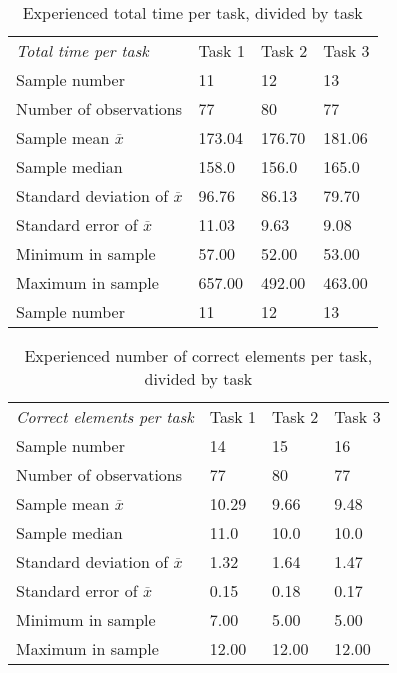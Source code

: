 \begin{table}[H]
	\centering
	\begin{tabular}{l|l|l|l}
		\textit{Total time per task} & Task 1 & Task 2 & Task 3 \\ 
		Sample number & 11  & 12  & 13   \\ \hline
		Number of observations & 77  & 80   & 77  \\
		Sample mean $\overline{x}$  & 173.04  &  176.70  &  181.06   \\
		Sample median  & 158.0  &  156.0  &  165.0  \\
		Standard deviation of $\overline{x}$ & 96.76  & 86.13  & 79.70   \\
		Standard error of $\overline{x}$ & 11.03 & 9.63 & 9.08  \\
		Minimum in sample   & 57.00  & 52.00 &  53.00  \\
		Maximum in sample  & 657.00 & 492.00  & 463.00 \\ \hline
		Sample number & 11  & 12  & 13   \\ \hline
	\end{tabular}
	\caption[Total time, task and experienved divided]{Experienced total time per task, divided by task}
	\label{tab:totaltime_tasks_experienced}
\end{table}

\begin{table}[H]
	\centering
	\begin{tabular}{l|l|l|l}
		\textit{Correct elements per task} & Task 1 & Task 2 & Task 3 \\ 
		Sample number & 14 & 15  & 16   \\ \hline
		Number of observations & 77    & 80      &  77  \\
		Sample mean $\overline{x}$ & 10.29  &  9.66  &  9.48   \\
		Sample median & 11.0  &  10.0  &  10.0  \\
		Standard deviation of $\overline{x}$ & 1.32  & 1.64  & 1.47   \\
		Standard error of $\overline{x}$ & 0.15  & 0.18  & 0.17   \\
		Minimum in sample & 7.00 & 5.00 &  5.00 \\
		Maximum in sample  & 12.00 & 12.00  & 12.00 \\ \hline
	\end{tabular}
	\caption[Correct elements, task and experienved divided]{Experienced number of correct elements per task, divided by task}
	\label{tab:totalcorrect_tasks_experienced}
\end{table}

